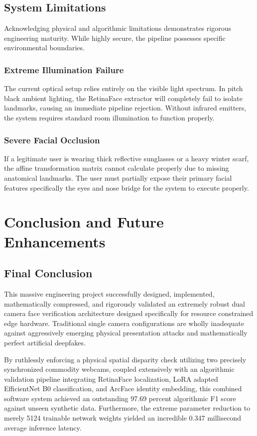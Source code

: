 \documentclass[12pt,a4paper]{report}
\begin{document}
\section{System Limitations}
Acknowledging physical and algorithmic limitations demonstrates rigorous engineering maturity. While highly secure, the pipeline possesses specific environmental boundaries.

\subsection{Extreme Illumination Failure}
The current optical setup relies entirely on the visible light spectrum. In pitch black ambient lighting, the RetinaFace extractor will completely fail to isolate landmarks, causing an immediate pipeline rejection. Without infrared emitters, the system requires standard room illumination to function properly.

\subsection{Severe Facial Occlusion}
If a legitimate user is wearing thick reflective sunglasses or a heavy winter scarf, the affine transformation matrix cannot calculate properly due to missing anatomical landmarks. The user must partially expose their primary facial features specifically the eyes and nose bridge for the system to execute properly.

\chapter{Conclusion and Future Enhancements}
\section{Final Conclusion}
This massive engineering project successfully designed, implemented, mathematically compressed, and rigorously validated an extremely robust dual camera face verification architecture designed specifically for resource constrained edge hardware. Traditional single camera configurations are wholly inadequate against aggressively emerging physical presentation attacks and mathematically perfect artificial deepfakes. 

By ruthlessly enforcing a physical spatial disparity check utilizing two precisely synchronized commodity webcams, coupled extensively with an algorithmic validation pipeline integrating RetinaFace localization, LoRA adapted EfficientNet B0 classification, and ArcFace identity embedding, this combined software system achieved an outstanding 97.69 percent algorithmic F1 score against unseen synthetic data. Furthermore, the extreme parameter reduction to merely 5124 trainable network weights yielded an incredible 0.347 millisecond average inference latency. 
\end{document}
